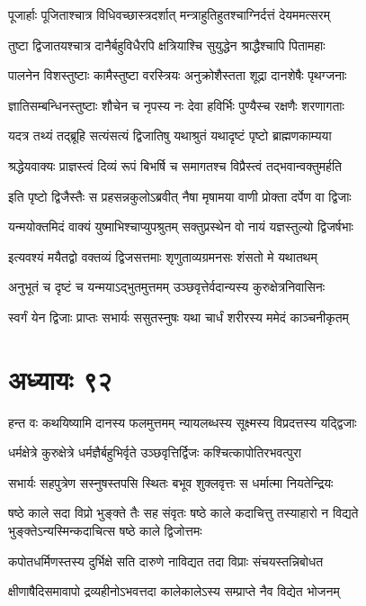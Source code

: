\twolineshloka
{पूजार्हाः पूजिताश्चात्र विधिवच्छास्त्रदर्शात्}
{मन्त्राहुतिहुतश्चाग्निर्दत्तं देयममत्सरम्}


\twolineshloka
{तुष्टा द्विजातयश्चात्र दानैर्बहुविधैरपि}
{क्षत्रियाश्चि सुयुद्धेन श्राद्धैश्चापि पितामहाः}


\twolineshloka
{पालनेन विशस्तुष्टाः कामैस्तुष्टा वरस्त्रियः}
{अनुक्रोशैस्तता शूद्रा दानशेषैः पृथग्जनाः}


\twolineshloka
{ज्ञातिसम्बन्धिनस्तुष्टाः शौचेन च नृपस्य नः}
{देवा हविर्भिः पुण्यैस्च रक्षणैः शरणागताः}


\twolineshloka
{यदत्र तथ्यं तद्ब्रूहि सत्यंसत्यं द्विजातिषु}
{यथाश्रुतं यथादृष्टं पृष्टो ब्राह्मणकाम्यया}


\twolineshloka
{श्रद्धेयवाक्यः प्राज्ञस्त्वं दिव्यं रूपं बिभर्षि च}
{समागतश्च विप्रैस्त्वं तद्भवान्वक्तुमर्हति}


\twolineshloka
{इति पृष्टो द्विजैस्तैः स प्रहसन्नकुलोऽब्रवीत्}
{नैषा मृषामया वाणी प्रोक्ता दर्पेण वा द्विजाः}


\twolineshloka
{यन्मयोक्तमिदं वाक्यं युष्माभिश्चाप्युपश्रुतम्}
{सक्तुप्रस्थेन वो नायं यज्ञस्तुल्यो द्विजर्षभाः}


\twolineshloka
{इत्यवश्यं मयैतद्वो वक्तव्यं द्विजसत्तमाः}
{शृणुताव्यग्रमनसः शंसतो मे यथातथम्}


\twolineshloka
{अनुभूतं च दृष्टं च यन्मयाऽद्भुतमुत्तमम्}
{उञ्छवृत्तेर्वदान्यस्य कुरुक्षेत्रनिवासिनः}


\twolineshloka
{स्वर्गं येन द्विजाः प्राप्तः सभार्यः ससुतस्नुषः}
{यथा चार्धं शरीरस्य ममेदं काञ्चनीकृतम्}


\chapter{अध्यायः ९२}
\twolineshloka
{हन्त वः कथयिष्यामि दानस्य फलमुत्तमम्}
{न्यायलब्धस्य सूक्ष्मस्य विप्रदत्तस्य यद्द्विजाः}


\twolineshloka
{धर्मक्षेत्रे कुरुक्षेत्रे धर्मज्ञैर्बहुभिर्वृते}
{उञ्छवृत्तिर्द्विजः कश्चित्कापोतिरभवत्पुरा}


\twolineshloka
{सभार्यः सहपुत्रेण सस्नुषस्तपसि स्थितः}
{बभूव शुक्लवृत्तः स धर्मात्मा नियतेन्द्रियः}


षष्ठे काले सदा विप्रो भुङ्क्ते तैः सह संवृतः
\twolineshloka
{षष्ठे काले कदाचित्तु तस्याहारो न विद्यते}
{भुङ्क्तेऽन्यस्मिन्कदाचित्स षष्ठे काले द्विजोत्तमः}


\twolineshloka
{कपोतधर्मिणस्तस्य दुर्भिक्षे सति दारुणे}
{नाविद्यत तदा विप्राः संचयस्तन्निबोधत}


\twolineshloka
{क्षीणाषैदिसमावापो द्रव्यहीनोऽभवत्तदा}
{कालेकालेऽस्य सम्प्राप्ते नैव विद्येत भोजनम्}


